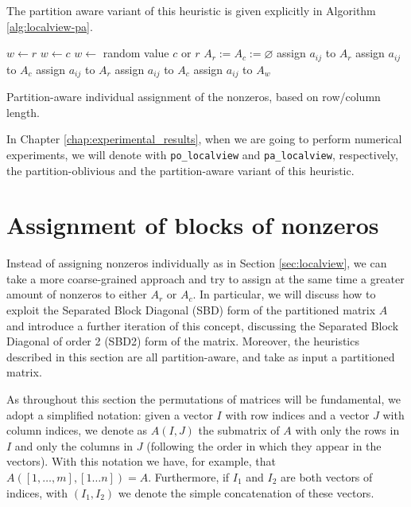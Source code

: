 The partition aware variant of this heuristic is given explicitly in Algorithm \ref{alg:localview-pa}.

\begin{algorithm}[h]
	\begin{algorithmic}
		\State
		\State $w \gets r$ 
		\State $w \gets c$
		\Else
		\State $w \gets$ random value $c$ or $r$
		\EndIf
		\State $A_r := A_c := \varnothing$
		\State assign $a_{ij}$ to $A_r$
		\State assign $a_{ij}$ to $A_c$
		\Else
		\State assign $a_{ij}$ to $A_r$
		\State assign $a_{ij}$ to $A_c$
		\Else
		\State assign $a_{ij}$ to $A_w$
		\EndIf
		\EndIf
		\EndFor
	\end{algorithmic}
	\caption{Partition-aware individual assignment of the nonzeros, based on row/column length.} \label{alg:localview-pa}
\end{algorithm}

In Chapter \ref{chap:experimental_results}, when we are going to perform numerical experiments, we will denote with \verb|po_localview| and \verb|pa_localview|, respectively, the partition-oblivious and the partition-aware variant of this heuristic. 

\section{Assignment of blocks of nonzeros} \label{sec:sbd}

Instead of assigning nonzeros individually as in Section \ref{sec:localview}, we can take a more coarse-grained approach and try to assign at the same time a greater amount of nonzeros to either $A_r$ or $A_c$. In particular, we will discuss how to exploit the Separated Block Diagonal (SBD) form of the partitioned matrix $A$ and introduce a further iteration of this concept, discussing the Separated Block Diagonal of order 2 (SBD2) form of the matrix. Moreover, the heuristics described in this section are all partition-aware, and take as input a partitioned matrix.

As throughout this section the permutations of matrices will be fundamental, we adopt a simplified notation: given a vector $I$ with row indices and a vector $J$ with column indices, we denote as $A(I,J)$ the submatrix of $A$ with only the rows in $I$ and only the columns in $J$ (following the order in which they appear in the vectors). With this notation we have, for example, that $A([1,\dots,m],[1 \dots n]) = A$. Furthermore, if $I_1$ and $I_2$ are both vectors of indices, with $(I_1,I_2)$ we denote the simple concatenation of these vectors.

